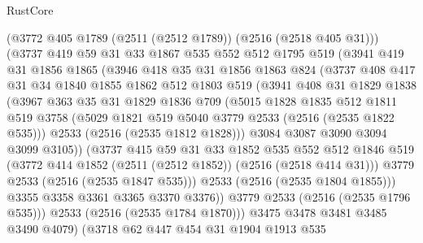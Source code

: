 \begin{lexlean}{RustCore}
\begin{coremodule}
          (@3772 @405 @1789 (@2511 (@2512 @1789)) (@2516 (@2518 @405 @31)))
          (@3737
            @419
            @59
            @31
            @33
            @1867
            @535
            @552
            @512
            @1795
            @519
            (@3941
              @419
              @31
              @1856
              @1865
              (@3946
                @418
                @35
                @31
                @1856
                @1863
                @824
                (@3737
                  @408
                  @417
                  @31
                  @34
                  @1840
                  @1855
                  @1862
                  @512
                  @1803
                  @519
                  (@3941
                    @408
                    @31
                    @1829
                    @1838
                    (@3967
                      @363
                      @35
                      @31
                      @1829
                      @1836
                      @709
                      (@5015
                        @1828
                        @1835
                        @512
                        @1811
                        @519
                        @3758
                        (@5029 @1821 @519 @5040 @3779 @2533 (@2516 (@2535 @1822 @535)))
                        @2533
                        (@2516 (@2535 @1812 @1828)))
                      @3084
                      @3087
                      @3090
                      @3094
                      @3099
                      @3105))
                  (@3737
                    @415
                    @59
                    @31
                    @33
                    @1852
                    @535
                    @552
                    @512
                    @1846
                    @519
                    (@3772 @414 @1852 (@2511 (@2512 @1852)) (@2516 (@2518 @414 @31)))
                    @3779
                    @2533
                    (@2516 (@2535 @1847 @535)))
                  @2533
                  (@2516 (@2535 @1804 @1855)))
                @3355
                @3358
                @3361
                @3365
                @3370
                @3376))
            @3779
            @2533
            (@2516 (@2535 @1796 @535)))
          @2533
          (@2516 (@2535 @1784 @1870)))
        @3475
        @3478
        @3481
        @3485
        @3490
        @4079)
      (@3718
        @62
        @447
        @454
        @31
        @1904
        @1913
        @535

\end{coremodule}
\end{lexlean}
